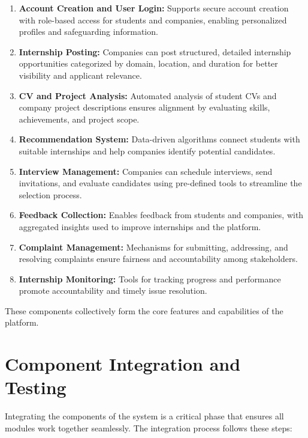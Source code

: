 \begin{enumerate}
    \item \textbf{Account Creation and User Login:}  
    Supports secure account creation with role-based access for students and companies, enabling personalized profiles and safeguarding information.

    \item \textbf{Internship Posting:}  
    Companies can post structured, detailed internship opportunities categorized by domain, location, and duration for better visibility and applicant relevance.

    \item \textbf{CV and Project Analysis:}  
    Automated analysis of student CVs and company project descriptions ensures alignment by evaluating skills, achievements, and project scope.

    \item \textbf{Recommendation System:}  
    Data-driven algorithms connect students with suitable internships and help companies identify potential candidates.

    \item \textbf{Interview Management:}  
    Companies can schedule interviews, send invitations, and evaluate candidates using pre-defined tools to streamline the selection process.

    \item \textbf{Feedback Collection:}  
    Enables feedback from students and companies, with aggregated insights used to improve internships and the platform.

    \item \textbf{Complaint Management:}  
    Mechanisms for submitting, addressing, and resolving complaints ensure fairness and accountability among stakeholders.

    \item \textbf{Internship Monitoring:}  
    Tools for tracking progress and performance promote accountability and timely issue resolution.
\end{enumerate}

These components collectively form the core features and capabilities of the platform.

\pagebreak
\section{Component Integration and Testing\label{sec:integration}}

Integrating the components of the system is a critical phase that ensures all modules work together seamlessly. The integration process follows these steps:

